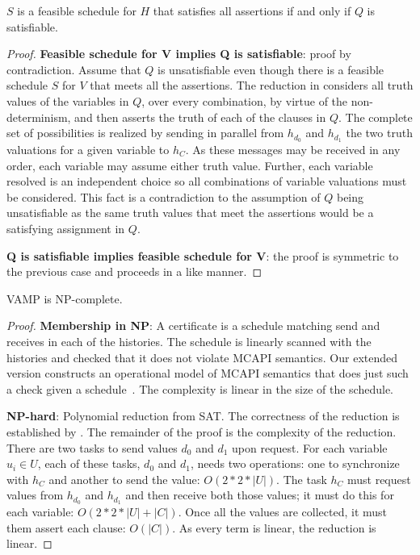 \begin{lemma} \label{lem:sat}
$S$ is a feasible schedule for $H$ that satisfies all assertions if
  and only if $Q$ is satisfiable.
\end{lemma}
\begin{proof}
\textbf{Feasible schedule for V implies Q is satisfiable}: proof by
contradiction. Assume that $Q$ is unsatisfiable even though there is a
feasible schedule $S$ for $V$ that meets all the assertions. The
reduction in  considers all truth values of the
variables in $Q$, over every combination, by virtue of the
non-determinism, and then asserts the truth of each of the clauses in
$Q$. The complete set of possibilities is realized by sending in
parallel from $h_{d_0}$ and $h_{d_1}$ the two truth valuations for a
given variable to $h_C$. As these messages may be received in any
order, each variable may assume either truth value. Further, each
variable resolved is an independent choice so all combinations of
variable valuations must be considered.  This fact is a contradiction
to the assumption of $Q$ being unsatisfiable as the same truth values
that meet the assertions would be a satisfying assignment in $Q$.

\noindent \textbf{Q is satisfiable implies feasible schedule for V}:
the proof is symmetric to the previous case and proceeds in a like
manner.
\end{proof}

\begin{theorem}[NP-complete]
VAMP is NP-complete.
\end{theorem}
\begin{proof}
\noindent\textbf{Membership in NP}: A certificate is a schedule
matching send and receives in each of the histories. The schedule is
linearly scanned with the histories and checked that it does not
violate MCAPI semantics. Our extended version constructs an
operational model of MCAPI semantics that does just such a check given
a schedule~\cite{extended-version}. The complexity is linear in the
size of the schedule.

\noindent\textbf{NP-hard}: Polynomial reduction from SAT. The
correctness of the reduction is established by .
The remainder of the proof is the complexity of the reduction. There
are two tasks to send values $d_0$ and $d_1$ upon request. For each
variable $u_i \in U$, each of these tasks, $d_0$ and $d_1$, needs two
operations: one to synchronize with $h_C$ and another to send the
value: $O(2 * 2 * |U|)$. The task $h_C$ must request values from
$h_{d_0}$ and $h_{d_1}$ and then receive both those values; it must do
this for each variable: $O(2 * 2 * |U| + |C|)$.  Once all the values
are collected, it must them assert each clause: $O(|C|)$. As every
term is linear, the reduction is linear.
\end{proof}
